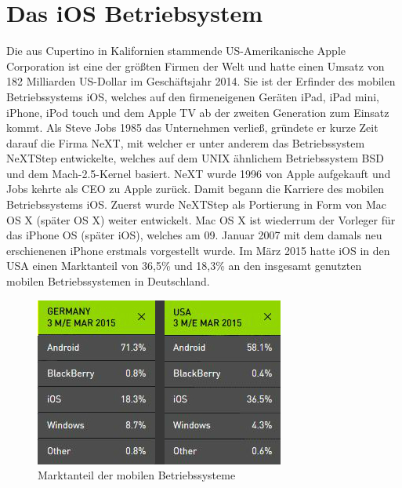 \section{Das iOS Betriebsystem}
	Die aus Cupertino in Kalifornien stammende US-Amerikanische Apple Corporation
	ist eine der größten Firmen der Welt und hatte einen Umsatz von 182 Milliarden
	US-Dollar im Geschäftsjahr 2014. Sie ist der Erfinder des mobilen
	Betriebssystems iOS, welches auf den firmeneigenen Geräten iPad, iPad mini,
	iPhone, iPod touch und dem Apple TV ab der zweiten Generation zum Einsatz
	kommt. Als Steve Jobs 1985 das Unternehmen verließ, gründete er
	kurze Zeit darauf die Firma NeXT, mit welcher er unter anderem das
	Betriebssystem NeXTStep entwickelte, welches auf dem UNIX ähnlichem
	Betriebssystem BSD\cite[S.12]{Tanenbaum2009} und dem Mach-2.5-Kernel
	\cite{MachProject2015} basiert. NeXT wurde 1996 von Apple aufgekauft und Jobs
	kehrte als CEO zu Apple zurück. Damit begann die Karriere des mobilen
	Betriebssystems iOS. Zuerst wurde NeXTStep als Portierung in Form von Mac OS X
	(später OS X) weiter entwickelt. Mac OS X ist wiederrum der Vorleger für das
	iPhone OS (später iOS), welches am 09. Januar 2007 mit dem damals neu
	erschienenen iPhone erstmals vorgestellt wurde. Im März 2015 hatte iOS in den USA einen
	Marktanteil von 36,5\% und 18,3\% an den insgesamt genutzten mobilen
	Betriebssystemen in Deutschland\cite{MobileOsStat}.
	
	\begin{figure}[h]
		\centering
		\includegraphics[width=0.5\linewidth]{ios/media/marketshare-cmp-201503.jpg}
		\caption{Marktanteil der mobilen Betriebssysteme
		\cite{MobileOsStat}}
		\label{fig:marcetshare}
	\end{figure}
